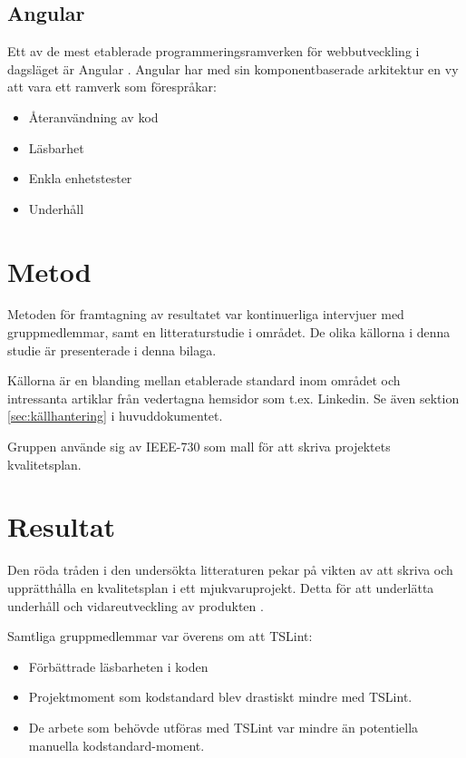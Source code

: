 \subsection{Angular}
Ett av de mest etablerade programmeringsramverken för webbutveckling i dagsläget är Angular \cite{altexsoft}. Angular har med sin komponentbaserade arkitektur en vy att vara ett ramverk som förespråkar:

\begin{itemize}
	\item Återanvändning av kod
	\item Läsbarhet
	\item Enkla enhetstester
	\item Underhåll
\end{itemize}

\section{Metod}

Metoden för framtagning av resultatet var kontinuerliga intervjuer med gruppmedlemmar, samt en litteraturstudie i området. De olika källorna i denna studie är presenterade i denna bilaga.

Källorna är en blanding mellan etablerade standard inom området och intressanta artiklar från vedertagna hemsidor som t.ex. Linkedin. Se även sektion \ref{sec:källhantering} i huvuddokumentet.

Gruppen använde sig av IEEE-730 som mall för att skriva projektets kvalitetsplan.

\section{Resultat}

Den röda tråden i den undersökta litteraturen pekar på vikten av att skriva och upprätthålla en kvalitetsplan i ett mjukvaruprojekt. Detta för att underlätta underhåll och vidareutveckling av produkten \cite{LCA}\cite{sustainable}\cite{ISOtor}\cite{altexsoft}. 

Samtliga gruppmedlemmar var överens om att TSLint:

\begin{itemize}
	\item Förbättrade läsbarheten i koden
	\item Projektmoment som kodstandard blev drastiskt mindre med TSLint.
	\item De arbete som behövde utföras med TSLint var mindre än potentiella manuella kodstandard-moment.
\end{itemize}

